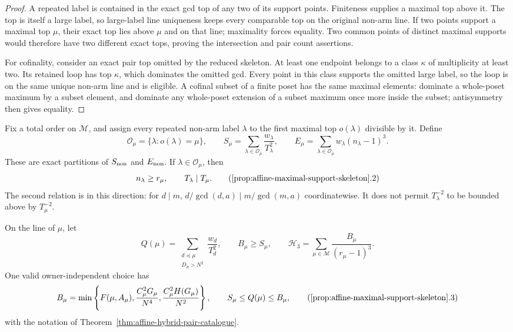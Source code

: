 \begin{proof}
A repeated label is contained in the exact gcd top of any two of its
support points.  Finiteness supplies a maximal top above it.  The top is
itself a large label, so large-label line uniqueness keeps every comparable
top on the original non-arm line.  If two points support a maximal top
\(\mu\), their exact top lies above \(\mu\) and on that line; maximality
forces equality.  Two common points of distinct maximal supports would
therefore have two different exact tops, proving the intersection and pair
count assertions.

For cofinality, consider an exact pair top omitted by the reduced skeleton.
At least one endpoint belongs to a class \(\kappa\) of multiplicity at least
two.  Its retained loop has top \(\kappa\), which dominates the omitted gcd.
Every point in this class supports the omitted large label, so the loop is
on the same unique non-arm line and is eligible.  A cofinal subset of a
finite poset has the same maximal elements: dominate a whole-poset maximum
by a subset element, and dominate any whole-poset extension of a subset
maximum once more inside the subset; antisymmetry then gives equality.
\end{proof}

Fix a total order on \(\mathcal M\), and assign every repeated non-arm label
\(\lambda\) to the first maximal top \(o(\lambda)\) divisible by it.  Define
\[
 \mathcal O_\mu=\{\lambda:o(\lambda)=\mu\},\qquad
 S_\mu=\sum_{\lambda\in\mathcal O_\mu}\frac{w_\lambda}{T_\lambda^2},\qquad
 E_\mu=\sum_{\lambda\in\mathcal O_\mu}w_\lambda(n_\lambda-1)^3.
\]
These are exact partitions of \(S_{\rm non}\) and \(E_{\rm non}\).  If
\(\lambda\in\mathcal O_\mu\), then
\[
 n_\lambda\ge r_\mu,\qquad T_\lambda\mid T_\mu.
 \tag{\ref{prop:affine-maximal-support-skeleton}.2}
\]
The second relation is in this direction: for \(d\mid m\),
\(d/\gcd(d,a)\mid m/\gcd(m,a)\) coordinatewise.  It does not permit
\(T_\lambda^{-2}\) to be bounded above by \(T_\mu^{-2}\).

On the line of \(\mu\), let
\[
 Q(\mu)=\sum_{\substack{d\preceq\mu\\D_d>N^2}}\frac{w_d}{T_d^2},\qquad
 B_\mu\ge S_\mu,\qquad
 \mathcal H_3=\sum_{\mu\in\mathcal M}\frac{B_\mu}{(r_\mu-1)^3}.
\]
One valid owner-independent choice has
\[
 B_\mu=\min\left\{F(\mu,A_\mu),\frac{C_\mu^2G_\mu}{N^4},
              \frac{C_\mu^2H(G_\mu)}{N^2}\right\},\qquad
 S_\mu\le Q(\mu)\le B_\mu,
 \tag{\ref{prop:affine-maximal-support-skeleton}.3}
\]
with the notation of Theorem~\ref{thm:affine-hybrid-pair-catalogue}.

